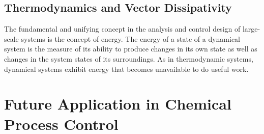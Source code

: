 \documentclass{paper}
\begin{document}
\subsection{Thermodynamics and Vector Dissipativity}
The fundamental and unifying concept in the analysis and control design of large-scale systems is the concept of energy. The energy
of a state of a dynamical system is the measure of its ability to produce changes in its own state as well as changes in the system 
states of its surroundings. As in thermodynamic systems, dynamical systems exhibit energy that becomes unavailable to do useful work. 
\section{Future Application in Chemical Process Control}



\end{document}
